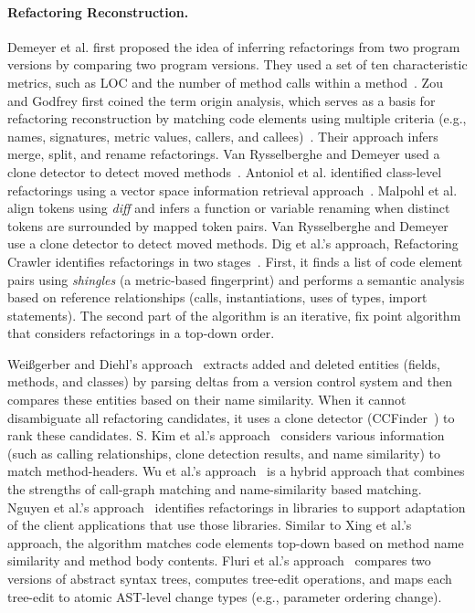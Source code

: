 \documentclass[runningheads,a4paper]{llncs}
\begin{document}
\paragraph{Refactoring Reconstruction.}  
Demeyer {et al.} first proposed the idea of inferring refactorings from two program versions by comparing two program versions. They used a set of ten characteristic metrics, such as LOC and the number of method calls within a method~\cite{Demeyer2000}. Zou and Godfrey first coined the term origin analysis, which serves as a basis for refactoring reconstruction by matching code elements using multiple criteria (e.g., names, signatures, metric values, callers, and callees)~\cite{Zou2005}. Their approach infers merge, split, and rename refactorings. Van Rysselberghe and Demeyer used a clone detector to detect moved methods~\cite{Rysselberghe2003}.  Antoniol {et al.} identified class-level refactorings using a vector space information retrieval approach~\cite{Antoniol2004}. Malpohl {et al.} \cite{Malpohl2000} align tokens using {\it diff} and infers a function or variable renaming when distinct tokens are surrounded by mapped token pairs. Van Rysselberghe and Demeyer \cite{Rysselberghe01} use a clone detector to detect moved methods. 
 Dig et al.'s approach, {Refactoring Crawler} identifies refactorings in two stages~\cite{Dig2006}. First, it finds a list of code element pairs using {\em shingles} (a metric-based fingerprint) and performs a semantic analysis based on reference relationships (calls, instantiations, uses of types, import statements). The second part of the algorithm is an iterative, fix point algorithm that considers refactorings in a top-down order. 

Wei{\ss}gerber and Diehl's approach~\cite{Weissgerber2006} extracts added and deleted entities (fields, methods, and classes) by parsing deltas from a version control system and then compares these entities based on their {name similarity}. When it cannot disambiguate all refactoring candidates, it uses a {clone detector} (CCFinder~\cite{Kamiya2002}) to rank these candidates. S. Kim et al.'s approach~\cite{SKim2005} considers various information (such as {calling relationships}, {clone detection} results, and {name similarity}) to match method-headers.  Wu et al.'s approach~\cite{Wu2010:aura} is a hybrid approach that combines the strengths of {call-graph matching} and {name-similarity} based matching. Nguyen et al.'s approach~\cite{Nguyen2010:libsync} identifies refactorings in libraries to support adaptation of the client applications that use those libraries. Similar to Xing et al.'s approach, the algorithm matches code elements top-down based on method name similarity and method body contents. Fluri et al.'s approach~\cite{Fluri2007} compares two versions of abstract syntax trees, computes tree-edit operations, and maps each tree-edit to atomic AST-level change types (e.g., parameter ordering change).
\end{document}
